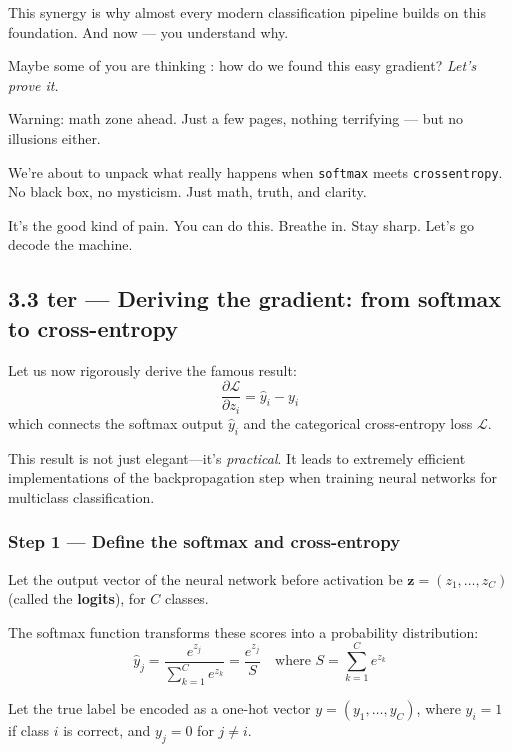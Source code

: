 \documentclass[11pt]{article}
\begin{document}
\noindent
This synergy is why almost every modern classification pipeline builds on this foundation. 
And now — you understand why.

\bigskip
Maybe some of you are thinking : how do we found this easy gradient?
\medskip
\noindent
\textit{Let's prove it.}

\begin{tcolorbox}[colback=gray!3!white, colframe=gray!70!black, title= Heads-up — No Magic Here]

Warning: math zone ahead.  
Just a few pages, nothing terrifying — but no illusions either.

We’re about to unpack what really happens when \texttt{softmax} meets \texttt{crossentropy}. No black box, no mysticism. Just math, truth, and clarity.

It’s the good kind of pain.  
You can do this. Breathe in. Stay sharp.  
Let’s go decode the machine.

\end{tcolorbox}

\subsection*{3.3 ter — Deriving the gradient: from softmax to cross-entropy}

Let us now rigorously derive the famous result:
\[
\boxed{
\frac{\partial \mathcal{L}}{\partial z_i} = \hat{y}_i - y_i
}
\]
which connects the softmax output $\hat{y}_i$ and the categorical cross-entropy loss $\mathcal{L}$.

This result is not just elegant—it’s \emph{practical}. It leads to extremely efficient implementations of the backpropagation step when training neural networks for multiclass classification.

\subsubsection*{Step 1 — Define the softmax and cross-entropy}

Let the output vector of the neural network before activation be $\mathbf{z} = (z_1, \ldots, z_C)$ (called the \textbf{logits}), for $C$ classes.

The softmax function transforms these scores into a probability distribution:
\[
\hat{y}_j = \frac{e^{z_j}}{\sum_{k=1}^C e^{z_k}} = \frac{e^{z_j}}{S}
\quad \text{where } S = \sum_{k=1}^C e^{z_k}
\]

Let the true label be encoded as a one-hot vector $y = (y_1, \ldots, y_C)$, where $y_i = 1$ if class $i$ is correct, and $y_j = 0$ for $j \ne i$.
\end{document}
